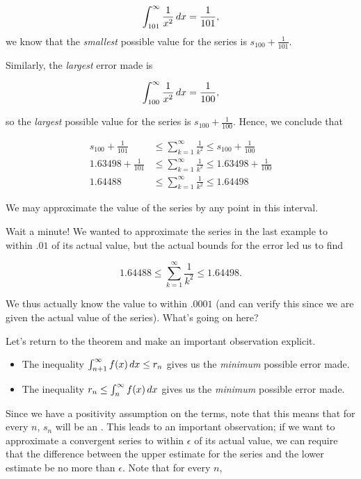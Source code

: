 \documentclass{ximera}
\begin{document}
\begin{model}
\[
\int_{101}^{\infty} \frac{1}{x^2} \mathop{}\!d x = \frac{1}{101},
\]
we know that the \emph{smallest} possible value for the series is $s_{100} +  \frac{1}{101}$.  

Similarly, the \emph{largest} error made is 

\[
\int_{100}^{\infty} \frac{1}{x^2} \mathop{}\!d x = \frac{1}{100},
\] 

so the \emph{largest} possible value for the series is $s_{100} +  \frac{1}{100}$.  Hence, we conclude that

\begin{align*}
s_{100} + \frac{1}{101} &\leq \sum_{k=1}^{\infty} \frac{1}{k^2} \leq s_{100} +  \frac{1}{100} \\
1.63498 + \frac{1}{101} & \leq \sum_{k=1}^{\infty} \frac{1}{k^2} \leq 1.63498 + \frac{1}{100} \\
1.64488 &\leq \sum_{k=1}^{\infty} \frac{1}{k^2} \leq 1.64498
\end{align*}

We may approximate the value of the series by any point in this interval.
\end{model}

Wait a minute!  We wanted to approximate the series in the last example to within $.01$ of its actual value, but the actual bounds for the error led us to find 

\[
1.64488 \leq \sum_{k=1}^{\infty} \frac{1}{k^2} \leq 1.64498. 
\]

We thus actually know the value to within $.0001$ (and can verify this since we are given the actual value of the series).  What's going on here?  

Let's return to the theorem and make an important observation explicit.

\begin{itemize}
\item The inequality $\int_{n+1}^{\infty} f(x) \mathop{}\!d x \leq  r_n$ gives us the \emph{minimum} possible error made.
\item The inequality $r_n \leq \int_{n}^{\infty} f(x) \mathop{}\!d x$ gives us the \emph{minimum} possible error made.
\end{itemize}

Since we have a positivity assumption on the terms, note that this means that for every $n$, $s_n$ will be an .  This leads to an important observation; if we want to approximate a convergent series to within $\epsilon$ of its actual value, we can require that the difference between the upper estimate for the series and the lower estimate be no more than $\epsilon$.  Note that for every $n$,
\end{document}
